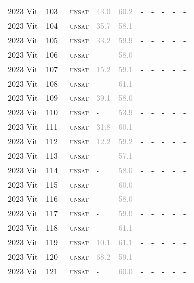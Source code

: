 \begin{center}
{\begin{longtable}{@{}llllllllll@{}}
2023 Vit & 103 & ~\textsc{unsat} & \textcolor{darkgray}{43.0} & \textcolor{darkgray}{60.2} & - & - & - & - & - \\
2023 Vit & 104 & ~\textsc{unsat} & \textcolor{darkgray}{35.7} & \textcolor{darkgray}{58.1} & - & - & - & - & - \\
2023 Vit & 105 & ~\textsc{unsat} & \textcolor{darkgray}{33.2} & \textcolor{darkgray}{59.9} & - & - & - & - & - \\
2023 Vit & 106 & ~\textsc{unsat} & - & \textcolor{darkgray}{58.0} & - & - & - & - & - \\
2023 Vit & 107 & ~\textsc{unsat} & \textcolor{darkgray}{15.2} & \textcolor{darkgray}{59.1} & - & - & - & - & - \\
2023 Vit & 108 & ~\textsc{unsat} & - & \textcolor{darkgray}{61.1} & - & - & - & - & - \\
2023 Vit & 109 & ~\textsc{unsat} & \textcolor{darkgray}{39.1} & \textcolor{darkgray}{58.0} & - & - & - & - & - \\
2023 Vit & 110 & ~\textsc{unsat} & - & \textcolor{darkgray}{53.9} & - & - & - & - & - \\
2023 Vit & 111 & ~\textsc{unsat} & \textcolor{darkgray}{31.8} & \textcolor{darkgray}{60.1} & - & - & - & - & - \\
2023 Vit & 112 & ~\textsc{unsat} & \textcolor{darkgray}{12.2} & \textcolor{darkgray}{59.2} & - & - & - & - & - \\
2023 Vit & 113 & ~\textsc{unsat} & - & \textcolor{darkgray}{57.1} & - & - & - & - & - \\
2023 Vit & 114 & ~\textsc{unsat} & - & \textcolor{darkgray}{58.0} & - & - & - & - & - \\
2023 Vit & 115 & ~\textsc{unsat} & - & \textcolor{darkgray}{60.0} & - & - & - & - & - \\
2023 Vit & 116 & ~\textsc{unsat} & - & \textcolor{darkgray}{58.0} & - & - & - & - & - \\
2023 Vit & 117 & ~\textsc{unsat} & - & \textcolor{darkgray}{59.0} & - & - & - & - & - \\
2023 Vit & 118 & ~\textsc{unsat} & - & \textcolor{darkgray}{61.1} & - & - & - & - & - \\
2023 Vit & 119 & ~\textsc{unsat} & \textcolor{darkgray}{10.1} & \textcolor{darkgray}{61.1} & - & - & - & - & - \\
2023 Vit & 120 & ~\textsc{unsat} & \textcolor{darkgray}{68.2} & \textcolor{darkgray}{59.1} & - & - & - & - & - \\
2023 Vit & 121 & ~\textsc{unsat} & - & \textcolor{darkgray}{60.0} & - & - & - & - & - \\

\end{longtable}}
\end{center}
